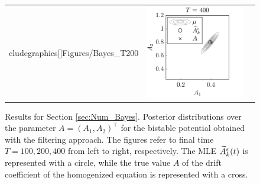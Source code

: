 \documentclass[10pt]{article}
\begin{document}
\begin{figure}[t]
\begin{tabular}{ccc}
cludegraphics[]{Figures/Bayes_T200}  & \includegraphics[]{Figures/Bayes_T400} \\
	\end{tabular}
	\caption{Results for Section \ref{sec:Num_Bayes}. Posterior distributions over the parameter $A = (A_1, A_2)^\top$ for the bistable potential obtained with the filtering approach. The figures refer to final time $T = 100, 200, 400$ from left to right, respectively. The MLE $\widetilde A^\varepsilon_k(t)$ is represented with a circle, while the true value $A$ of the drift coefficient of the homogenized equation is represented with a cross.}
	\label{fig:Bayes}
\end{figure}
\end{document}
